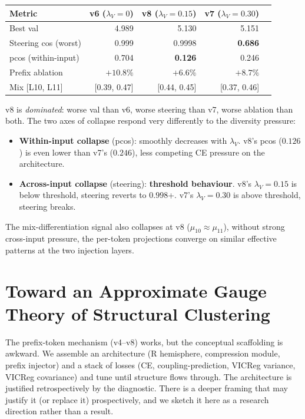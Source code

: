 \documentclass[11pt, a4paper]{article}
\theoremstyle{plain}
\theoremstyle{definition}
\theoremstyle{remark}
\begin{document}
\begin{center}
\begin{tabular}{lrrrr}
\toprule
Metric & v6 ($\lambda_V{=}0$) & v8 ($\lambda_V{=}0.15$) & v7 ($\lambda_V{=}0.30$) \\
\midrule
Best val & 4.989 & 5.130 & 5.151 \\
Steering cos (worst) & 0.999 & 0.9998 & \textbf{0.686} \\
pcos (within-input) & 0.704 & \textbf{0.126} & 0.246 \\
Prefix ablation & $+10.8\%$ & $+6.6\%$ & $+8.7\%$ \\
Mix [L10, L11] & [0.39, 0.47] & [0.44, 0.45] & [0.37, 0.46] \\
\bottomrule
\end{tabular}
\end{center}

v8 is \emph{dominated}: worse val than v6, worse steering than v7, worse ablation than both.
The two axes of collapse respond very differently to the diversity pressure:
\begin{itemize}[nosep]
\item \textbf{Within-input collapse} (pcos): smoothly decreases with $\lambda_V$. v8's pcos ($0.126$) is even lower than v7's ($0.246$), less competing CE pressure on the architecture.
\item \textbf{Across-input collapse} (steering): \textbf{threshold behaviour}. v8's $\lambda_V = 0.15$ is below threshold, steering reverts to $0.998$+. v7's $\lambda_V = 0.30$ is above threshold, steering breaks.
\end{itemize}
The mix-differentiation signal also collapses at v8 ($\mu_{10} \approx \mu_{11}$), without strong cross-input pressure, the per-token projections converge on similar effective patterns at the two injection layers.


\section{Toward an Approximate Gauge Theory of Structural Clustering}
\label{sec:gauge-lorn}

The prefix-token mechanism (v4--v8) works, but the conceptual scaffolding is awkward.
We assemble an architecture (R hemisphere, compression module, prefix injector) and a stack of losses (CE, coupling-prediction, VICReg variance, VICReg covariance) and tune until structure flows through.
The architecture is justified retrospectively by the diagnostic.
There is a deeper framing that may justify it (or replace it) prospectively, and we sketch it here as a research direction rather than a result.
\end{document}
